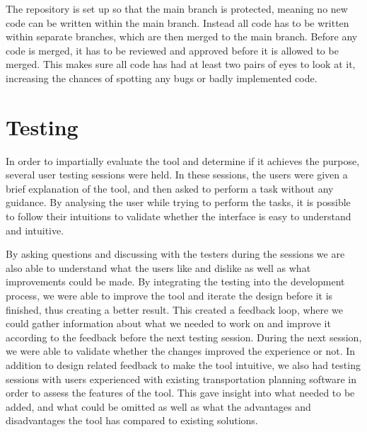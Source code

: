         The repository is set up so that the main branch is protected, meaning no new code can be written within the main branch. Instead all code has to be written within separate branches, which are then merged to the main branch. Before any code is merged, it has to be reviewed and approved before it is allowed to be merged. This makes sure all code has had at least two pairs of eyes to look at it, increasing the chances of spotting any bugs or badly implemented code.

\section{Testing}
    In order to impartially evaluate the tool and determine if it achieves the purpose, several user testing sessions were held. In these sessions, the users were given a brief explanation of the tool, and then asked to perform a task without any guidance. By analysing the user while trying to perform the tasks, it is possible to follow their intuitions to validate whether the interface is easy to understand and intuitive.

    By asking questions and discussing with the testers during the sessions we are also able to understand what the users like and dislike as well as what improvements could be made. By integrating the testing into the development process, we were able to improve the tool and iterate the design before it is finished, thus creating a better result. This created a feedback loop, where we could gather information about what we needed to work on and improve it according to the feedback before the next testing session. During the next session, we were able to validate whether the changes improved the experience or not. In addition to design related feedback to make the tool intuitive, we also had testing sessions with users experienced with existing transportation planning software in order to assess the features of the tool. This gave insight into what needed to be added, and what could be omitted as well as what the advantages and disadvantages the tool has compared to existing solutions.